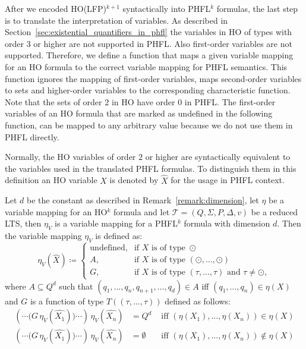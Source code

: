 After we encoded HO(LFP)$^{k+1}$ syntactically into PHFL$^k$ formulas, the last step is to translate the 
interpretation of variables. As described in Section~\ref{sec:existential_quantifiers_in_phfl} the variables in HO of 
types with order $3$ or higher are not supported in PHFL. Also first-order variables are not supported. Therefore, we 
define a function that maps a given variable mapping for an HO formula to the correct variable mapping for PHFL 
semantics. This function ignores the mapping of first-order variables, maps second-order variables to sets and 
higher-order variables to the corresponding characteristic function. Note that the sets of order $2$ in HO have order 
$0$ in PHFL. The first-order variables of an HO formula that are marked as undefined in the following function, can be 
mapped to any arbitrary value because we do not use them in PHFL directly.

    Normally, the HO variables of order $2$ or higher are syntactically equivalent to the variables used in the translated PHFL formulas. To distinguish them in this definition an HO variable $X$ is denoted by $\hat{X}$ for the usage in PHFL context. 

\begin{definition}
    \label{definition:lower_bound_variable_function}
    Let $d$ be the constant as described in Remark~\ref{remark:dimension}, let $\eta$ be a
    variable mapping for an HO$^k$ formula and let $\mathcal{T} = (Q, \Sigma, P, \Delta, v)$ be a reduced LTS, then $\eta_V$ is a 
    variable mapping for a PHFL$^k$ formula with dimension $d$. Then the variable mapping $\eta_V$ is defined as:
    \[\eta_V(\hat{X})\coloneqq
    \begin{cases}
        \text{undefined}, & \text{if } X \text{ is of type } \odot \\
        A,  & \text{if } X \text{ is of type } (\odot, \dots, \odot)\\
        G, & \text{if } X \text{ is of type } (\tau, \dots, \tau) \text{ and } \tau \neq \odot,
    \end{cases}\]
    where $A \subseteq Q^d$ such that $(q_1, \dots, q_n, q_{n + 1}, \dots, q_d) \in A$ iff $(q_1, \dots, q_n) \in
    \eta(X)$ and $G$ is a function of type $T((\tau, \dots, \tau))$ defined as follows:
    \begin{align*}
        (\dotsb\big(G\,\eta_V(\hat{X_1})\big)\dotsb)\,\eta_V(\hat{X_n}) &= Q^d &\text{ iff } (\eta(X_1), \dots, \eta(X_n)) \in \eta(X)\\
        (\dotsb\big(G\,\eta_V(\hat{X_1})\big)\dotsb)\,\eta_V(\hat{X_n}) &= \emptyset &\text{ iff } (\eta(X_1), \dots, \eta(X_n))
        \not\in \eta(X)
    \end{align*}
\end{definition}

